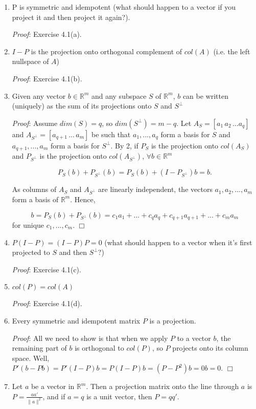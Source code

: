 \documentclass[12pt,oneside]{article}
\begin{document}
\begin{enumerate}
\item P is symmetric and idempotent (what should happen to a vector if
  you project it and then project it again?).

\emph{Proof}: Exercise 4.1(a).

\item $I - P$ is the projection onto orthogonal complement of $col(A)$
  (i.e. the left nullspace of $A$)

\emph{Proof}: Exercise 4.1(b).

\item Given any vector $b \in {\mathbb{R}}^m$ and any subspace $S$ of
  ${\mathbb{R}}^m$, $b$ can be written (uniquely) as the sum of its
  projections onto $S$ and $S^\perp$

\emph{Proof}: Assume $dim(S) = q$, so $dim(S^\perp) = m-q$.  Let $A_S = [a_1 \, a_2 \, ... a_q]$ and $A_{S^\perp} = [a_{q+1} \, ... \, a_m]$ be such that $a_1,...,a_q$ form a basis for $S$ and $a_{q+1}, ..., a_m$ form a basis for $S^\perp$.  By 2, if $P_S$ is the projection onto $col(A_S)$ and $P_{S^\perp}$ is the projection onto $col(A_{S^\perp})$, $\forall b \in  {\mathbb{R}}^m$

\[P_S (b) + P_{S^\perp} (b) = P_S (b) + (I - P_{S^\perp})b = b. \]

As columns of $A_S$ and $A_{S^\perp}$ are linearly independent, the vectors $a_1,a_2,...,a_m$ form a basis of $\mathbb{R}^m$.  Hence,

\[b = P_S(b) + P_{S^\perp}(b) = c_1a_1+...+c_qa_q+c_{q+1}a_{q+1}+...+c_ma_m \]
for unique $c_1,...,c_m$. $\Box$

\item $P(I-P) = (I-P)P = 0$ (what should happen to a vector when it's
  first projected to $S$ and then $S^ \perp?$)

\emph{Proof}: Exercise 4.1(c).

\item $col(P) = col(A)$

\emph{Proof}: Exercise 4.1(d).

\item Every symmetric and idempotent matrix $P$ is a projection.

\emph{Proof}: All we need to show is that when we apply $P$ to a vector $b$, the
  remaining part of $b$ is orthogonal to $col(P)$, so $P$ projects
  onto its column space. Well, $P'(b-Pb) = P'(I - P)b = P(I-P)b = (P -
  P^2)b = 0b = 0$. $\Box$

\item Let $a$ be a vector in ${\mathbb{R}}^m$. Then a projection
  matrix onto the line through $a$ is $P = \frac{a a'}{\|a\|^2}$, and if
  $a = q$ is a unit vector, then $P = qq'$.



\end{enumerate}
\end{document}
